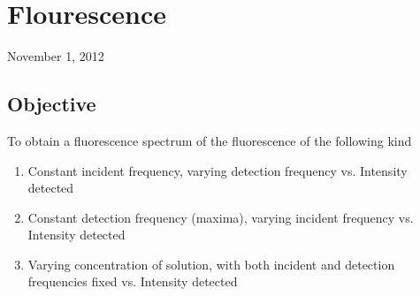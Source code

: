 \chapter{Flourescence}
\begin{flushright}
November 1, 2012
\end{flushright}
\section{Objective}
To obtain a fluorescence spectrum of the fluorescence of the following kind
	\begin{enumerate}
		\item Constant incident frequency, varying detection frequency vs. Intensity detected
		\item Constant detection frequency (maxima), varying incident frequency vs. Intensity detected
		\item Varying concentration of solution, with both incident and detection frequencies fixed vs. Intensity detected
	\end{enumerate}

